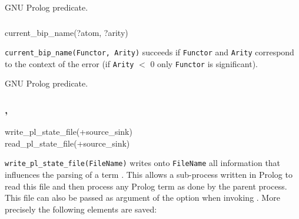 \Portability

GNU Prolog predicate.

\subsubsection{\label{current-bip-name/2}}

\begin{TemplatesOneCol}
current\_bip\_name(?atom, ?arity)

\end{TemplatesOneCol}

\Description

\texttt{current\_bip\_name(Functor, Arity)} succeeds if \texttt{Functor} and
\texttt{Arity} correspond to the context of the error  (if \texttt{Arity} $<$ 0 only \texttt{Functor} is
significant).

\begin{PlErrors}



\end{PlErrors}

\Portability

GNU Prolog predicate.

\subsubsection{,\label{write-pl-state-file/1}
               }

\begin{TemplatesOneCol}
write\_pl\_state\_file(+source\_sink)\\
read\_pl\_state\_file(+source\_sink)

\end{TemplatesOneCol}

\Description

\texttt{write\_pl\_state\_file(FileName)} writes onto \texttt{FileName} all
information that influences the parsing of a term . This allows a sub-process written in Prolog to read this
file and then process any Prolog term as done by the parent process. This
file can also be passed as argument of the  option when
invoking  . More precisely the
following elements are saved:

